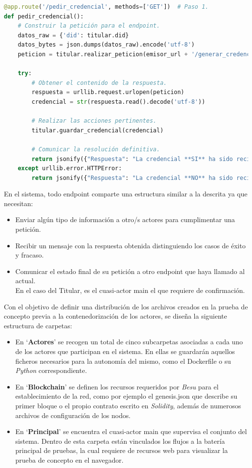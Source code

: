 \documentclass[../main.tex]{subfiles}
\begin{document}
\begin{lstlisting}[language=Python]
@app.route('/pedir_credencial', methods=['GET'])  # Paso 1.
def pedir_credencial():
    # Construir la petición para el endpoint.
    datos_raw = {'did': titular.did}
    datos_bytes = json.dumps(datos_raw).encode('utf-8')
    peticion = titular.realizar_peticion(emisor_url + '/generar_credencial', datos_bytes, 'POST')

    try:
        # Obtener el contenido de la respuesta.
        respuesta = urllib.request.urlopen(peticion)
        credencial = str(respuesta.read().decode('utf-8'))

        # Realizar las acciones pertinentes.
        titular.guardar_credencial(credencial)

        # Comunicar la resolución definitiva.
        return jsonify({"Respuesta": "La credencial **SI** ha sido recibida y guardada."}), 200
    except urllib.error.HTTPError:
        return jsonify({"Respuesta": "La credencial **NO** ha sido recibida ni guardada."}), 400
\end{lstlisting}

\noindent En el sistema, todo endpoint comparte una estructura similar a la descrita ya que necesitan: 
\begin{itemize}
    \item Enviar algún tipo de información a otro/s actores para cumplimentar una petición.
    \item Recibir un mensaje con la respuesta obtenida distinguiendo los casos de éxito y fracaso.
    \item Comunicar el estado final de su petición a otro endpoint que haya llamado al actual. \\
    En el caso del Titular, es el cuasi-actor main el que requiere de confirmación.
\end{itemize}

\newpage
\noindent Con el objetivo de definir una distribución de los archivos creados en la prueba de concepto previa a la contenedorización de los actores, se diseña la siguiente estructura de carpetas:

\begin{itemize}
    \item En `\textbf{Actores}' se recogen un total de cinco subcarpetas asociadas a cada uno de los actores que participan en el sistema. En ellas se guardarán aquellos ficheros necesarios para la autonomía del mismo, como el Dockerfile o su \textit{Python} correspondiente.

    \item En `\textbf{Blockchain}' se definen los recursos requeridos por \textit{Besu} para el establecimiento de la red, como por ejemplo el genesis.json que describe su primer bloque o el propio contrato escrito en \textit{Solidity}, además de numerosos archivos de configuración de los nodos.  

    \item En `\textbf{Principal}' se encuentra el cuasi-actor main que supervisa el conjunto del sistema. Dentro de esta carpeta están vinculados los flujos a la batería principal de pruebas, la cual requiere de recursos web para visualizar la prueba de concepto en el navegador. 
\end{itemize}
\end{document}
